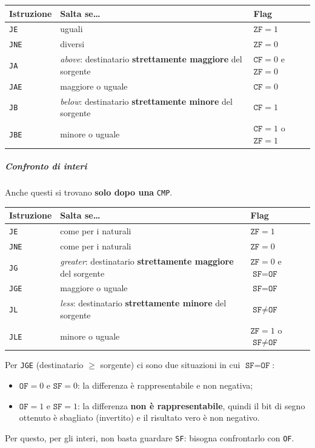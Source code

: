 \documentclass[11pt,a4paper]{article}
\begin{document}
\begin{center}
\begin{tabular}{l l l}
\textbf{Istruzione} & \textbf{Salta se\ldots} & \textbf{Flag} \\ \hline
\texttt{JE}  & uguali & $\texttt{ZF}=1$ \\
\texttt{JNE} & diversi & $\texttt{ZF}=0$ \\
\texttt{JA}  & \emph{above}: destinatario \textbf{strettamente maggiore} del sorgente & $\texttt{CF}=0$ e $\texttt{ZF}=0$ \\
\texttt{JAE} & maggiore o uguale & $\texttt{CF}=0$ \\
\texttt{JB}  & \emph{below}: destinatario \textbf{strettamente minore} del sorgente & $\texttt{CF}=1$ \\
\texttt{JBE} & minore o uguale & $\texttt{CF}=1$ o $\texttt{ZF}=1$ \\
\end{tabular}
\end{center}

\subparagraph*{Confronto di interi}

Anche questi si trovano \textbf{solo dopo una} \texttt{CMP}.

\begin{center}
\begin{tabular}{l l l}
\textbf{Istruzione} & \textbf{Salta se\ldots} & \textbf{Flag} \\ \hline
\texttt{JE}  & come per i naturali & $\texttt{ZF}=1$ \\
\texttt{JNE} & come per i naturali & $\texttt{ZF}=0$ \\
\texttt{JG}  & \emph{greater}: destinatario \textbf{strettamente maggiore} del sorgente & $\texttt{ZF}=0$ e $\texttt{SF}=\texttt{OF}$ \\
\texttt{JGE} & maggiore o uguale & $\texttt{SF}=\texttt{OF}$ \\
\texttt{JL}  & \emph{less}: destinatario \textbf{strettamente minore} del sorgente & $\texttt{SF}\neq\texttt{OF}$ \\
\texttt{JLE} & minore o uguale & $\texttt{ZF}=1$ o $\texttt{SF}\neq\texttt{OF}$ \\
\end{tabular}
\end{center}

\begin{integrazione}
Per \texttt{JGE} (destinatario $\geq$ sorgente) ci sono due situazioni in cui $\texttt{SF}=\texttt{OF}$:
\begin{itemize}[leftmargin=*]
  \item $\texttt{OF}=0$ e $\texttt{SF}=0$: la differenza è rappresentabile e non negativa;
  \item $\texttt{OF}=1$ e $\texttt{SF}=1$: la differenza \textbf{non è rappresentabile}, quindi il bit di segno ottenuto è sbagliato (invertito) e il risultato vero è non negativo.
\end{itemize}
Per questo, per gli interi, non basta guardare \texttt{SF}: bisogna confrontarlo con \texttt{OF}.
\end{integrazione}
\end{document}
